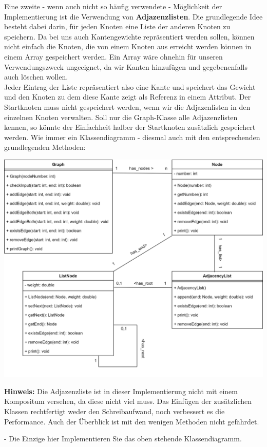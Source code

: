 \documentclass{article}
\begin{document}
Eine zweite - wenn auch nicht so häufig verwendete - Möglichkeit der Implementierung ist die Verwendung von \textbf{Adjazenzlisten}. Die grundlegende Idee besteht dabei darin, für jeden Knoten eine Liste der anderen Knoten zu speichern. Da bei uns auch Kantengewichte repräsentiert werden sollen, können nicht einfach die Knoten, die von einem Knoten aus erreicht werden können in einem Array gespeichert werden. Ein Array wäre ohnehin für unseren Verwendungszweck ungeeignet, da wir Kanten hinzufügen und gegebenenfalls auch löschen wollen. \\
Jeder Eintrag der Liste repräsentiert also eine Kante und speichert das Gewicht und den Knoten zu dem diese Kante zeigt als Referenz in einem Attribut. Der Startknoten muss nicht gespeichert werden, wenn wir die Adjazenlisten in den einzelnen Knoten verwalten. Soll nur die Graph-Klasse alle Adjazenzlisten kennen, so könnte der Einfachheit halber der Startknoten zusätzlich gespeichert werden. Wie immer ein Klassendiagramm - diesmal auch mit den entsprechenden grundlegenden Methoden: 
\begin{center}
    \includegraphics[scale=0.2]{../../media/graphs_lists.png}
\end{center}
\textbf{Hinweis:} Die Adjazenzliste ist in dieser Implementierung nicht mit einem Kompositum versehen, da diese nicht viel  muss. Das Einfügen der zusätzlichen Klassen rechtfertigt weder den Schreibaufwand, noch verbessert es die Performance. Auch der Überblick ist mit den wenigen Methoden nicht gefährdet. 
\begin{task}{- Die Einzige hier}
    Implementieren Sie das oben stehende Klassendiagramm.
\end{task}
\end{document}
